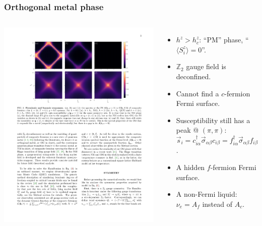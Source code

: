 \documentclass[xcolor=table, 10pt, aspectratio=43]{beamer}
\begin{document}
\begin{frame}
\frametitle{Orthogonal metal phase}
\begin{columns}
	\includegraphics[width=.9\columnwidth]{../orthogonal_metal/om}
	\begin{itemize}
	\item $h^z > h_c^z$: ``PM'' phase, ``$\langle S_i^z\rangle=0$''.
	\item $\mathbb Z_2$ gauge field is deconfined.
	\item Cannot find a $c$-fermion Fermi surface.
	\item Susceptibility still has a peak @ $(\pi,\pi)$: $\vec s_i= c_{i\alpha}^\dagger\vec\sigma_{\alpha\beta}c_{i\beta}
	= f_{i\alpha}^\dagger\vec\sigma_{\alpha\beta}f_{i\beta}$.
	\item A hidden $f$-fermion Fermi surface.
	\item A non-Fermi liquid: $\nu_e = A_f$ instead of $A_c$.
	\end{itemize}
\end{columns}
\end{frame}
\end{document}
